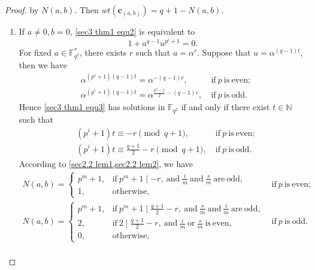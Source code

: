\documentclass[sn-mathphys-num]{sn-jnl}%
\theoremstyle{thmstyleone}%
\theoremstyle{thmstyletwo}%
\theoremstyle{thmstylethree}%
\begin{document}
\begin{proof}
	by $N(a,b)$. Then $wt(\mathbf{c}_{(a,b)})=q+1-N(a,b)$.
	\begin{enumerate}[label = \bf Case \arabic*:, leftmargin=4.1em]
		\item If $a\ne0,b=0$, \cref{sec3 thm1 equ2} is equivalent to 
		\begin{equation}
			\label{sec3 thm1 equ3}
			1+a^{q-1}u^{p^i+1}=0.
		\end{equation}
		For fixed $a \in \mathbb{F}_{q^2}^\ast$, there exists $r$ such that $a=\alpha^r$. Suppose that $u=\alpha^{(q-1)t}$, then we have
		\begin{equation*}
			\begin{aligned}
				&\alpha^{(p^i+1)(q-1)t}=\alpha^{-(q-1)r},\ &\mathrm{if}\ p\ \mathrm{is\ even};\\
				&\alpha^{(p^i+1)(q-1)t}=\alpha^{\frac{q^2-1}{2}-(q-1)r},\ &\mathrm{if}\ p\ \mathrm{is\ odd}.
			\end{aligned}
		\end{equation*}
		Hence \cref{sec3 thm1 equ3} has solutions in $\mathbb{F}_{q^2}$ if and only if there exist $t\in\mathbb{N}$ such that
		\begin{equation}
			\begin{aligned}
				&\left(p^i+1\right)t \equiv -r \pmod {q+1},\ &\mathrm{if}\ p\ \mathrm{is\ even};\\
				&\left(p^i+1\right)t \equiv \frac{q+1}{2}-r \pmod {q+1},\ &\mathrm{if}\ p\ \mathrm{is\ odd}.
			\end{aligned}
		\end{equation}
		According to \cref{sec2.2 lem1,sec2.2 lem2}, we have
		\begin{equation*}
			\begin{array}{ll}
				N(a,b)=\left\{\begin{array}{ll}
					p^m+1, &\mathrm{if}\ p^m+1\mid -r,\ \mathrm{and}\ \frac{i}{m}\ \mathrm{and}\ \frac{s}{m}\ \mathrm{are\ odd},\\
					1, &\mathrm{otherwise},\end{array}\right. &\mathrm{if}\ p\ \mathrm{is\ even;}\\
				N(a,b)=\left\{\begin{array}{ll}
					p^m+1, &\mathrm{if}\ p^m+1\mid \frac{q+1}{2}-r,\ \mathrm{and}\ \frac{s}{m}\ \mathrm{and}\ \frac{i}{m}\ \mathrm{are\ odd},\\
					2, &\mathrm{if}\ 2\mid \frac{q+1}{2}-r,\ \mathrm{and}\ \frac{i}{m}\ \mathrm{or}\ \frac{s}{m}\ \mathrm{is\ even},\\
					0,&\mathrm{otherwise,}\end{array}\right. &\mathrm{if}\ p\ \mathrm{is\ odd.}\\
			\end{array}
		\end{equation*}
		

\end{enumerate}
\end{proof}
\end{document}
